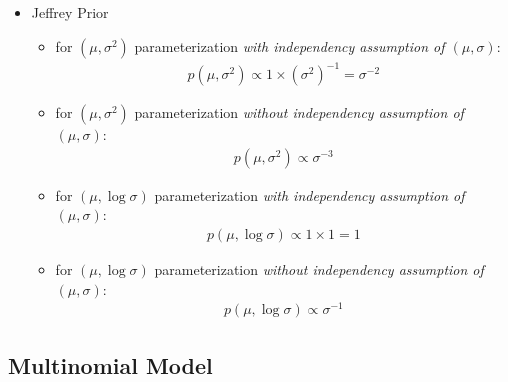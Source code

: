 \begin{itemize}[topsep=2pt,itemsep=0pt]
    
    

    \item Jeffrey Prior
    \begin{itemize}[topsep=2pt,itemsep=0pt]
        \item for $ (\mu ,\sigma ^2) $ parameterization \textit{with independency assumption of $ (\mu ,\sigma  )$}:
    \begin{align*}
        p(\mu ,\sigma ^2) \propto 1\times (\sigma ^2)^{-1}=\sigma ^{-2}
    \end{align*}
        \item for $ (\mu ,\sigma ^2) $ parameterization \textit{without independency assumption of $ (\mu ,\sigma  )$}:
    \begin{align*}
        p(\mu ,\sigma ^2) \propto \sigma ^{-3}
    \end{align*}
        \item for $ (\mu ,\log \sigma ) $ parameterization \textit{with independency assumption of $ (\mu ,\sigma  )$}:
    \begin{align*}
        p(\mu ,\log \sigma ) \propto 1\times 1 = 1
    \end{align*}
        \item for $ (\mu ,\log \sigma ) $ parameterization \textit{without independency assumption of $ (\mu ,\sigma  )$}:
    \begin{align*}
        p(\mu ,\log \sigma ) \propto \sigma ^{-1}
    \end{align*}
        
        
    \end{itemize}
    
         

    
    
    
\end{itemize}

    









\subsection{Multinomial Model}\label{SubSubSectionBayesianMultinom}

